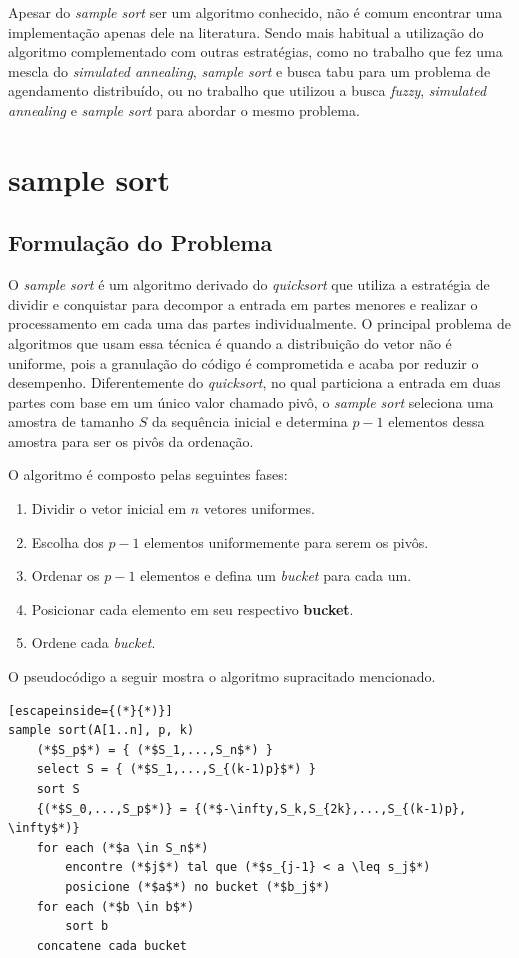 \documentclass[letterpaper, 10 pt, conference]{ieeeconf}  %
\begin{document}
Apesar do \textit{sample sort} ser um algoritmo conhecido, não é comum encontrar uma implementação apenas dele na literatura. Sendo mais habitual a utilização do algoritmo complementado com outras estratégias, como no trabalho \cite{c3} que fez uma mescla do \textit{simulated annealing}, \textit{sample sort} e busca tabu para um problema de agendamento distribuído, ou no trabalho \cite{c4} que utilizou a busca \textit{fuzzy}, \textit{simulated annealing} e \textit{sample sort} para abordar o mesmo problema.

\section{sample sort}

\subsection{Formulação do Problema}
O \textit{sample sort} é um algoritmo derivado do \textit{quicksort} que utiliza a estratégia de dividir e conquistar para decompor a entrada em partes menores e realizar o processamento em cada uma das partes individualmente. O principal problema de algoritmos que usam essa técnica é quando a distribuição do vetor não é uniforme, pois a granulação do código é comprometida e acaba por reduzir o desempenho. Diferentemente do \textit{quicksort}, no qual particiona a entrada em duas partes com base em um único valor chamado pivô, o \textit{sample sort} seleciona uma amostra de tamanho $S$ da sequência inicial e determina $p - 1$ elementos dessa amostra para ser os pivôs da ordenação. 

O algoritmo é composto pelas seguintes  fases:
\begin{enumerate}
    \item Dividir o vetor inicial em $n$ vetores uniformes.
    \item Escolha dos  $p - 1$ elementos uniformemente para serem os pivôs.
    \item Ordenar os $p - 1$ elementos e defina um \textit{bucket} para cada um.
    \item Posicionar cada elemento em seu respectivo \textbf{bucket}.
    \item Ordene cada \textit{bucket}.
\end{enumerate}

O pseudocódigo a seguir mostra o algoritmo supracitado mencionado.
\begin{lstlisting}[escapeinside={(*}{*)}]
sample sort(A[1..n], p, k)
    (*$S_p$*) = { (*$S_1,...,S_n$*) }
    select S = { (*$S_1,...,S_{(k-1)p}$*) }
    sort S
    {(*$S_0,...,S_p$*)} = {(*$-\infty,S_k,S_{2k},...,S_{(k-1)p}, \infty$*)}
    for each (*$a \in S_n$*)
        encontre (*$j$*) tal que (*$s_{j-1} < a \leq s_j$*)
        posicione (*$a$*) no bucket (*$b_j$*)
    for each (*$b \in b$*)
        sort b
    concatene cada bucket
        
    
\end{lstlisting}
\end{document}

